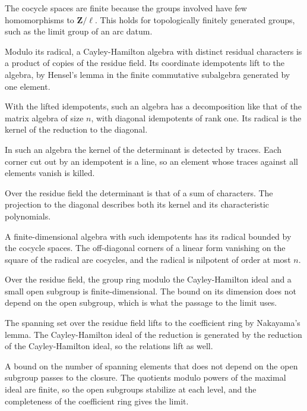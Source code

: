 The cocycle spaces are finite because the groups involved have few homomorphisms to $\mathbf Z/\ell$. This holds for topologically finitely generated groups, such as the limit group of an arc datum.

Modulo its radical, a Cayley-Hamilton algebra with distinct residual characters is a product of copies of the residue field. Its coordinate idempotents lift to the algebra, by Hensel's lemma in the finite commutative subalgebra generated by one element.

With the lifted idempotents, such an algebra has a decomposition like that of the matrix algebra of size $n$, with diagonal idempotents of rank one. Its radical is the kernel of the reduction to the diagonal.

In such an algebra the kernel of the determinant is detected by traces. Each corner cut out by an idempotent is a line, so an element whose traces against all elements vanish is killed.

Over the residue field the determinant is that of a sum of characters. The projection to the diagonal describes both its kernel and its characteristic polynomials.

A finite-dimensional algebra with such idempotents has its radical bounded by the cocycle spaces. The off-diagonal corners of a linear form vanishing on the square of the radical are cocycles, and the radical is nilpotent of order at most $n$.

Over the residue field, the group ring modulo the Cayley-Hamilton ideal and a small open subgroup is finite-dimensional. The bound on its dimension does not depend on the open subgroup, which is what the passage to the limit uses.

The spanning set over the residue field lifts to the coefficient ring by Nakayama's lemma. The Cayley-Hamilton ideal of the reduction is generated by the reduction of the Cayley-Hamilton ideal, so the relations lift as well.

A bound on the number of spanning elements that does not depend on the open subgroup passes to the closure. The quotients modulo powers of the maximal ideal are finite, so the open subgroups stabilize at each level, and the completeness of the coefficient ring gives the limit.

